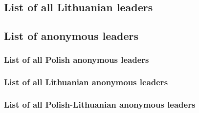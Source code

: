 \subsection{List of all Lithuanian leaders}
\subsection{List of anonymous leaders}
\subsubsection{List of all Polish anonymous leaders}
\listanonymepologne
\subsubsection{List of all Lithuanian anonymous leaders}
\listanonymelithuanie
\subsubsection{List of all Polish-Lithuanian anonymous leaders}
\listanonymepollit

\list@anonyme

\list@missionaries{\Xcatholique}
\list@anonyme

\list@landKGIC
\list@sea
\list@anonyme

\list@anonyme

